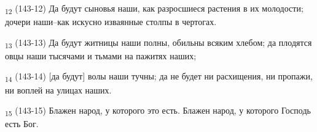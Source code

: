 \begin{tcolorbox}
\textsubscript{12} (143-12) Да будут сыновья наши, как разросшиеся растения в их молодости; дочери наши--как искусно изваянные столпы в чертогах.
\end{tcolorbox}
\begin{tcolorbox}
\textsubscript{13} (143-13) Да будут житницы наши полны, обильны всяким хлебом; да плодятся овцы наши тысячами и тьмами на пажитях наших;
\end{tcolorbox}
\begin{tcolorbox}
\textsubscript{14} (143-14) [да будут] волы наши тучны; да не будет ни расхищения, ни пропажи, ни воплей на улицах наших.
\end{tcolorbox}
\begin{tcolorbox}
\textsubscript{15} (143-15) Блажен народ, у которого это есть. Блажен народ, у которого Господь есть Бог.
\end{tcolorbox}
